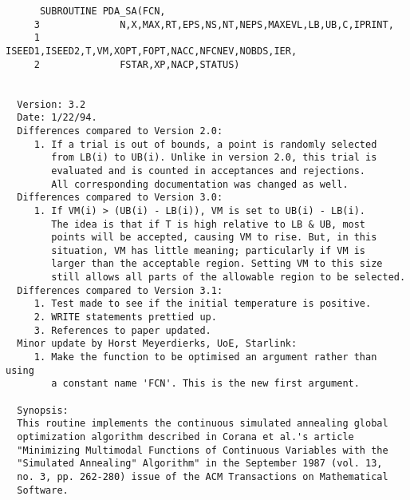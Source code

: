 \begin{verbatim}
      SUBROUTINE PDA_SA(FCN,
     3              N,X,MAX,RT,EPS,NS,NT,NEPS,MAXEVL,LB,UB,C,IPRINT,
     1              ISEED1,ISEED2,T,VM,XOPT,FOPT,NACC,NFCNEV,NOBDS,IER,
     2              FSTAR,XP,NACP,STATUS)


  Version: 3.2
  Date: 1/22/94.
  Differences compared to Version 2.0:
     1. If a trial is out of bounds, a point is randomly selected
        from LB(i) to UB(i). Unlike in version 2.0, this trial is
        evaluated and is counted in acceptances and rejections.
        All corresponding documentation was changed as well.
  Differences compared to Version 3.0:
     1. If VM(i) > (UB(i) - LB(i)), VM is set to UB(i) - LB(i).
        The idea is that if T is high relative to LB & UB, most
        points will be accepted, causing VM to rise. But, in this
        situation, VM has little meaning; particularly if VM is
        larger than the acceptable region. Setting VM to this size
        still allows all parts of the allowable region to be selected.
  Differences compared to Version 3.1:
     1. Test made to see if the initial temperature is positive.
     2. WRITE statements prettied up.
     3. References to paper updated.
  Minor update by Horst Meyerdierks, UoE, Starlink:
     1. Make the function to be optimised an argument rather than using
        a constant name 'FCN'. This is the new first argument.

  Synopsis:
  This routine implements the continuous simulated annealing global
  optimization algorithm described in Corana et al.'s article
  "Minimizing Multimodal Functions of Continuous Variables with the
  "Simulated Annealing" Algorithm" in the September 1987 (vol. 13,
  no. 3, pp. 262-280) issue of the ACM Transactions on Mathematical
  Software.


\end{verbatim}
